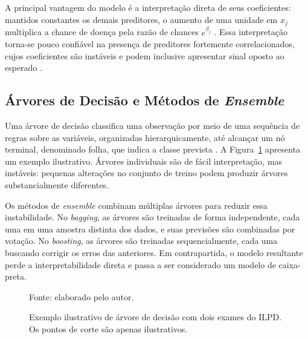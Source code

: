 A principal vantagem do modelo é a interpretação direta de seus coeficientes: mantidos constantes os demais preditores, o aumento de uma unidade em $x_j$ multiplica a chance de doença pela razão de chances $e^{\beta_j}$ \cite{Hosmer2005Applied}. Essa interpretação torna-se pouco confiável na presença de preditores fortemente correlacionados, cujos coeficientes são instáveis e podem inclusive apresentar sinal oposto ao esperado \cite{Dormann2013Collinearity}.

\subsection{Árvores de Decisão e Métodos de \textit{Ensemble}}
\label{sec:fund_arvores}

Uma árvore de decisão classifica uma observação por meio de uma sequência de regras sobre as variáveis, organizadas hierarquicamente, até alcançar um nó terminal, denominado folha, que indica a classe prevista \cite{elementsofstatiscal}. A Figura~\ref{fig:fund_arvore} apresenta um exemplo ilustrativo. Árvores individuais são de fácil interpretação, mas instáveis: pequenas alterações no conjunto de treino podem produzir árvores substancialmente diferentes.

Os métodos de \textit{ensemble} combinam múltiplas árvores para reduzir essa instabilidade. No \textit{bagging}, as árvores são treinadas de forma independente, cada uma em uma amostra distinta dos dados, e suas previsões são combinadas por votação. No \textit{boosting}, as árvores são treinadas sequencialmente, cada uma buscando corrigir os erros das anteriores. Em contrapartida, o modelo resultante perde a interpretabilidade direta e passa a ser considerado um modelo de caixa-preta.

\begin{figure}[htbp]
\centering
{}
\caption{Exemplo ilustrativo de árvore de decisão com dois exames do ILPD. Os pontos de corte são apenas ilustrativos.}
\label{fig:fund_arvore}
{\small Fonte: elaborado pelo autor.}
\end{figure}

